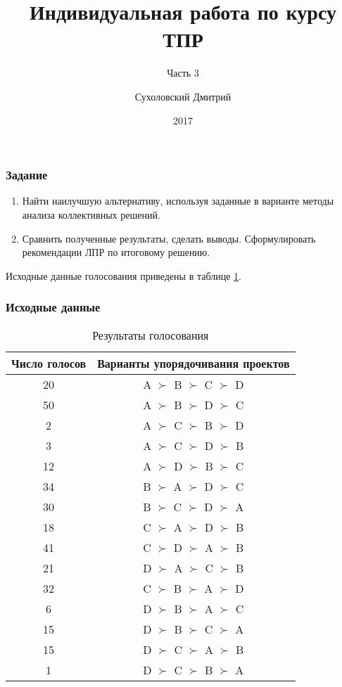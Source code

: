 \documentclass[10pt]{beamer}
\title{Индивидуальная работа по курсу ТПР}
\subtitle{Часть 3}
\author{Сухоловский Дмитрий}
\institute{Южный Федеральный Университет}
\date{2017}
\begin{document}
\frame{\titlepage}

\begin{frame}
\frametitle{Задание}
  \begin{enumerate}
    \item Найти наилучшую альтернативу, используя заданные в варианте методы анализа коллективных решений.
    \item Сравнить полученные результаты, сделать выводы. Сформулировать рекомендации ЛПР по итоговому решению.
  \end{enumerate}
  Исходные данные голосования приведены в таблице \ref{t1}.
\end{frame}

\begin{frame}
\frametitle{Исходные данные}
  \begin{table}
    \caption{Результаты голосования}
    \label{t1}
    \begin{tabular}{|c|c|}
      \hline
      Число голосов & Варианты упорядочивания проектов \\
      \hline
      20	&  A $\succ$ B $\succ$ C $\succ$ D \\
      50	&  A $\succ$ B $\succ$ D $\succ$ C \\
      2	  &  A $\succ$ C $\succ$ B $\succ$ D \\
      3	  &  A $\succ$ C $\succ$ D $\succ$ B \\
      12	&  A $\succ$ D $\succ$ B $\succ$ C \\
      34	&  B $\succ$ A $\succ$ D $\succ$ C \\
      30	&  B $\succ$ C $\succ$ D $\succ$ A \\
      18	&  C $\succ$ A $\succ$ D $\succ$ B \\
      41	&  C $\succ$ D $\succ$ A $\succ$ B \\
      21	&  D $\succ$ A $\succ$ C $\succ$ B \\
      32	&  C $\succ$ B $\succ$ A $\succ$ D \\
      6	  &  D $\succ$ B $\succ$ A $\succ$ C \\
      15	&  D $\succ$ B $\succ$ C $\succ$ A \\
      15	&  D $\succ$ C $\succ$ A $\succ$ B \\
      1	  &  D $\succ$ C $\succ$ B $\succ$ A \\
      \hline
    \end{tabular}
  \end{table}
\end{frame}
\end{document}
